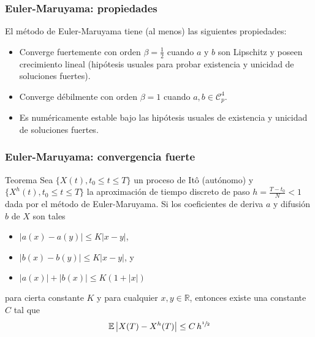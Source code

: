 \documentclass[10pt]{beamer}
\newcommand{\abs}[1]{\ensuremath{\left\lvert #1 \right\rvert}}
\newcommand{\Real}{\mathbb{R}}
\newcommand{\Exp}[1]{\ensuremath{\mathbb{E} #1}}
\begin{document}
\frame
{
    \frametitle{Euler-Maruyama: propiedades}

    El método de Euler-Maruyama tiene (al menos) las siguientes propiedades:

    \begin{itemize}
        \item<2-> Converge fuertemente con orden $\beta = \frac{1}{2}$
        cuando $a$ y $b$ son Lipschitz y poseen crecimiento lineal (hipótesis usuales para
        probar existencia y unicidad de soluciones fuertes).

        \item<3-> Converge débilmente con orden $\beta = 1$ cuando $a, b \in \mathcal{C}^4_p$.

        \item<4-> Es numéricamente estable bajo las hipótesis usuales de existencia y unicidad
        de soluciones fuertes.
    \end{itemize}

}

\frame
{
    \frametitle{Euler-Maruyama: convergencia fuerte}

    \begin{block}{Teorema}
    Sea $\{X(t), t_0 \leq t \leq T\}$ un proceso de Itô (autónomo) y $\{X^h(t), t_0 \leq t \leq T\}$
    la aproximación de tiempo discreto de paso $h = \frac{T-t_0}{N} < 1$ dada por el método de Euler-Maruyama.
    Si los coeficientes de deriva $a$ y difusión $b$ de $X$ son tales
    \begin{itemize}
        \item $\abs{a(x) - a(y)} \leq K \abs{x-y}$,
        \item $\abs{b(x) - b(y)} \leq K \abs{x-y}$, y
        \item $\abs{a(x)} + \abs{b(x)} \leq K (1 + \abs{x})$
    \end{itemize}
    para cierta constante $K$ y para cualquier $x, y \in \Real$, entonces
    existe una constante $C$ tal que
    $$\Exp{\abs{X(T) - X^h(T)}} \leq C \, h^{\sfrac{1}{2}}$$
    \end{block}
}
\end{document}
